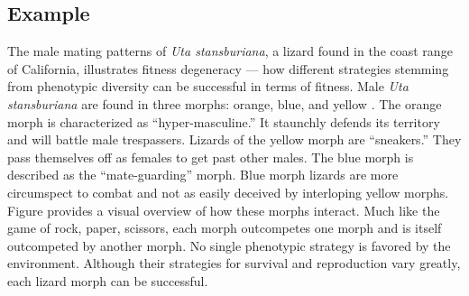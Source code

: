 \subsection{Example}
The male mating patterns of \textit{Uta stansburiana}, a lizard found in the coast range of California, illustrates fitness degeneracy --- how different strategies stemming from phenotypic diversity can be successful in terms of fitness.
Male \textit{Uta stansburiana} are found in three morphs: orange, blue, and yellow \cite{Sinervo1996TheStrategies}.
The orange morph is characterized as ``hyper-masculine.''
It staunchly defends its territory and will battle male trespassers.
Lizards of the yellow morph are ``sneakers.''
They pass themselves off as females to get past other males.
The blue morph is described as the ``mate-guarding'' morph.
Blue morph lizards are more circumspect to combat and not as easily deceived by interloping yellow morphs.
Figure  provides a visual overview of how these morphs interact.
Much like the game of rock, paper, scissors, each morph outcompetes one morph and is itself outcompeted by another morph.
No single phenotypic strategy is favored by the environment.
Although their strategies for survival and reproduction vary greatly, each lizard morph can be successful.
